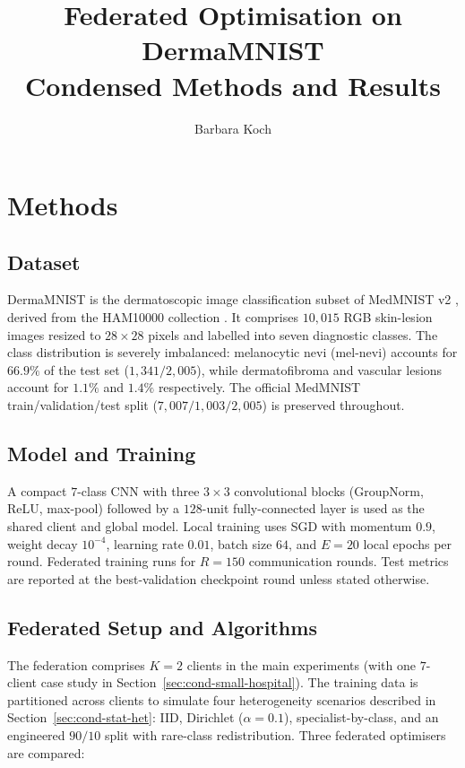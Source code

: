 \documentclass[11pt,a4paper]{report}
\title{Federated Optimisation on DermaMNIST\\
\large Condensed Methods and Results}
\author{Barbara Koch}
\date{}
\begin{document}
\maketitle

\chapter{Methods}
\label{ch:methods-condensed}

\section{Dataset}
\label{sec:cond-dataset}

DermaMNIST is the dermatoscopic image classification subset of MedMNIST v2
\citep{yang2023medmnistv2}, derived from the HAM10000 collection
\citep{tschandl2018ham10000}. It comprises $10{,}015$ RGB skin-lesion images
resized to $28 \times 28$ pixels and labelled into seven diagnostic classes.
The class distribution is severely imbalanced: melanocytic nevi (mel-nevi)
accounts for $66.9\%$ of the test set ($1{,}341 / 2{,}005$), while
dermatofibroma and vascular lesions account for $1.1\%$ and $1.4\%$
respectively. The official MedMNIST train/validation/test split
($7{,}007/1{,}003/2{,}005$) is preserved throughout.

\section{Model and Training}
\label{sec:cond-model}

A compact $7$-class CNN with three $3 \times 3$ convolutional blocks
(GroupNorm, ReLU, max-pool) followed by a $128$-unit fully-connected layer is
used as the shared client and global model. Local training uses SGD with
momentum $0.9$, weight decay $10^{-4}$, learning rate $0.01$, batch size $64$,
and $E = 20$ local epochs per round. Federated training runs for $R = 150$
communication rounds. Test metrics are reported at the best-validation
checkpoint round unless stated otherwise.

\section{Federated Setup and Algorithms}
\label{sec:cond-fl}

The federation comprises $K = 2$ clients in the main experiments (with one
$7$-client case study in Section~\ref{sec:cond-small-hospital}). The training
data is partitioned across clients to simulate four heterogeneity scenarios
described in Section~\ref{sec:cond-stat-het}: IID, Dirichlet ($\alpha = 0.1$),
specialist-by-class, and an engineered $90/10$ split with rare-class
redistribution. Three federated optimisers are compared:
\end{document}
